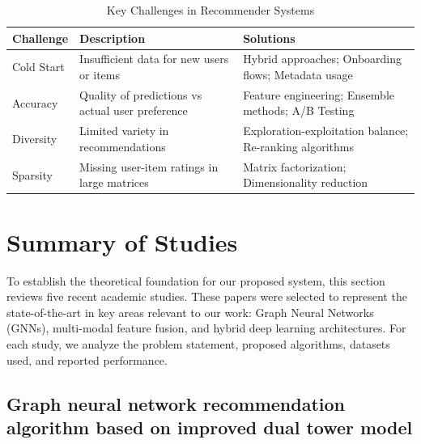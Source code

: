 \begin{table}[H]

\centering

\caption{Key Challenges in Recommender Systems}

\label{tab:recommendation_challenges}

\renewcommand{\arraystretch}{1.3}

\begin{tabular}{|p{3.0cm}|p{4.5cm}|p{6.0cm}|}

\hline

\textbf{Challenge} & \textbf{Description} & \textbf{Solutions} \\ \hline

Cold Start & Insufficient data for new users or items & Hybrid approaches; Onboarding flows; Metadata usage \\ \hline

Accuracy & Quality of predictions vs actual user preference & Feature engineering; Ensemble methods; A/B Testing \\ \hline

Diversity & Limited variety in recommendations & Exploration-exploitation balance; Re-ranking algorithms \\ \hline

Sparsity & Missing user-item ratings in large matrices & Matrix factorization; Dimensionality reduction \\ \hline

\end{tabular}

\end{table}



\section{Summary of Studies}

\label{sec:summary_of_studies}



To establish the theoretical foundation for our proposed system, this section reviews five recent academic studies. These papers were selected to represent the state-of-the-art in key areas relevant to our work: Graph Neural Networks (GNNs), multi-modal feature fusion, and hybrid deep learning architectures. For each study, we analyze the problem statement, proposed algorithms, datasets used, and reported performance.



\subsection{Graph neural network recommendation algorithm based on improved dual tower model}

